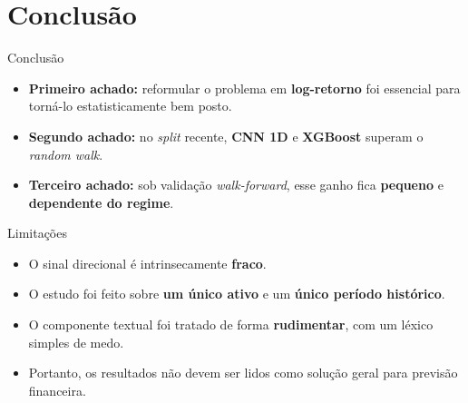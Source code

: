 \documentclass{libs/ufc_format}
\begin{document}
\section{Conclusão}

\begin{frame}{Conclusão}
    \begin{itemize}
        \item \textbf{Primeiro achado:} reformular o problema em \textbf{log-retorno} foi essencial para torná-lo estatisticamente bem posto.
        \item \textbf{Segundo achado:} no \emph{split} recente, \textbf{CNN 1D} e \textbf{XGBoost} superam o \emph{random walk}.
        \item \textbf{Terceiro achado:} sob validação \emph{walk-forward}, esse ganho fica \textbf{pequeno} e \textbf{dependente do regime}.
    \end{itemize}

    \vspace{0.3cm}
\end{frame}

\begin{frame}{Limitações}
    \begin{itemize}
        \item O sinal direcional é intrinsecamente \textbf{fraco}.
        \item O estudo foi feito sobre \textbf{um único ativo} e um \textbf{único período histórico}.
        \item O componente textual foi tratado de forma \textbf{rudimentar}, com um léxico simples de medo.
        \item Portanto, os resultados não devem ser lidos como solução geral para previsão financeira.
    \end{itemize}
\end{frame}
\end{document}
